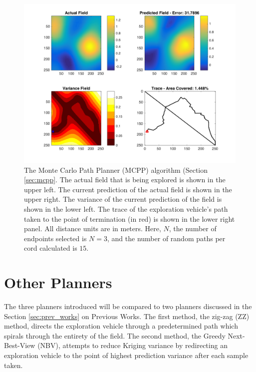 

\begin{figure}[htb!]
	\centering
	\includegraphics[width=0.95\linewidth]{figures/mc_4panel.png}
	\captionsetup{skip=0.20\baselineskip}
	\ssp
	\caption{The Monte Carlo Path Planner (MCPP) algorithm (Section \ref{sec:mcpp}. The actual field that is being explored is shown in the upper left. The current prediction of the actual field is shown in the upper right. The variance of the current prediction of the field is shown in the lower left. The trace of the exploration vehicle's path taken to the point of termination (in red) is shown in the lower right panel. All distance units are in meters. Here, $N$, the number of endpoints selected is $N=3$, and the number of random paths per cord calculated is $15$.}
	\label{fig:mcpp}
\end{figure}
\clearpage

\section{Other Planners}
The three planners introduced will be compared to two planners discussed in the Section \ref{sec:prev_works} on Previous Works. The first method, the zig-zag (ZZ) method, directs the exploration vehicle through a predetermined path which spirals through the entirety of the field. The second method, the Greedy Next-Best-View (NBV), attempts to reduce Kriging variance by redirecting an exploration vehicle to the point of highest prediction variance after each sample taken.

